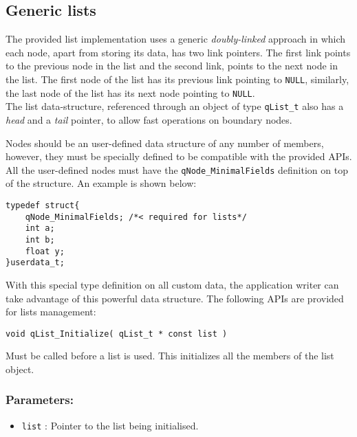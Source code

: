 \subsection{Generic lists} \label{qlist}
The provided list implementation uses a generic \textit{doubly-linked} approach in which each node, apart from storing its data, has two link pointers. The first link points to the previous node in the list and the second link, points to the next node in the list. The first node of the list has its previous link pointing to \lstinline{NULL}, similarly, the last node of the list has its next node pointing to \lstinline{NULL}. \\
The list data-structure, referenced through an object of type \lstinline{qList_t}  also has a \textit{head} and a \textit{tail} pointer, to allow fast operations on boundary nodes.



Nodes should be an user-defined data structure of any number of members, however, they must be specially defined to be compatible with the provided APIs. All the user-defined nodes must have the \lstinline{qNode_MinimalFields} definition on top of the structure. An example is shown below:
\medskip

\begin{lstlisting}[style=CStyle]
typedef struct{
    qNode_MinimalFields; /*< required for lists*/
    int a;
    int b;
    float y;
}userdata_t;
\end{lstlisting}

With this special type definition on all custom data, the application writer can take advantage of this powerful data structure. The following APIs are provided for lists management:

\noindent\hrulefill


\begin{lstlisting}[style=CStyle]
void qList_Initialize( qList_t * const list )
\end{lstlisting}

Must be called before a list is used.  This initializes all the members of the 
list object. 

\subsubsection*{Parameters:}
\begin{itemize}
    \item \lstinline{list} : Pointer to the list being initialised. 
\end{itemize}

